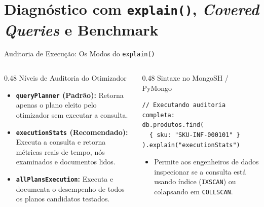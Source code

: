 \section[Diagnóstico, Covered Queries e Benchmark]{Diagnóstico com \texttt{explain()}, \textit{Covered Queries} e Benchmark}

\begin{frame}[fragile]{Auditoria de Execução: Os Modos do \texttt{explain()}}
  \vspace{0.05cm}
  \begin{columns}[t]
    \begin{column}{0.48\textwidth}
      \alert{Níveis de Auditoria do Otimizador}\par
      \scriptsize
      \begin{itemize}
        \item \textbf{\texttt{queryPlanner} (Padrão):} Retorna apenas o plano eleito pelo otimizador sem executar a consulta.
        \item \textbf{\texttt{executionStats} (Recomendado):} Executa a consulta e retorna métricas reais de tempo, nós examinados e documentos lidos.
        \item \textbf{\texttt{allPlansExecution}:} Executa e documenta o desempenho de todos os planos candidatos testados.
      \end{itemize}
    \end{column}
    \begin{column}{0.48\textwidth}
      \alert{Sintaxe no MongoSH / PyMongo}\par
      \begin{lstlisting}[language=mongosh]
// Executando auditoria completa:
db.produtos.find(
  { sku: "SKU-INF-000101" }
).explain("executionStats")
      \end{lstlisting}
      \scriptsize
      \begin{itemize}
        \item Permite aos engenheiros de dados inspecionar se a consulta está usando índice (\texttt{IXSCAN}) ou colapsando em \texttt{COLLSCAN}.
      \end{itemize}
    \end{column}
  \end{columns}
\end{frame}

